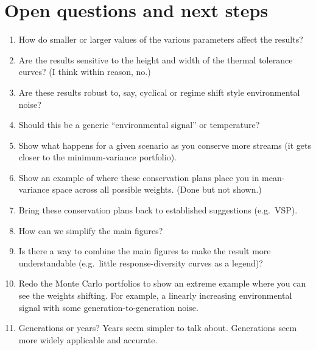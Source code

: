 \documentclass[12pt]{article}
\begin{document}
\section{Open questions and next steps}

\begin{enumerate}
\def\labelenumi{\arabic{enumi}.}
\itemsep1pt\parskip0pt
\item
  How do smaller or larger values of the various parameters affect the
  results?
\item
  Are the results sensitive to the height and width of the thermal
  tolerance curves? (I think within reason, no.)
\item
  Are these results robust to, say, cyclical or regime shift style
  environmental noise?
\item
  Should this be a generic ``environmental signal'' or temperature?
\item
  Show what happens for a given scenario as you conserve more streams
  (it gets closer to the minimum-variance portfolio).
\item
  Show an example of where these conservation plans place you in
  mean-variance space across all possible weights. (Done but not shown.)
\item
  Bring these conservation plans back to established suggestions
  (e.g.~VSP).
\item
  How can we simplify the main figures?
\item
  Is there a way to combine the main figures to make the result more
  understandable (e.g.~little response-diversity curves as a legend)?
\item
  Redo the Monte Carlo portfolios to show an extreme example where you
  can see the weights shifting. For example, a linearly increasing
  environmental signal with some generation-to-generation noise.
\item
  Generations or years? Years seem simpler to talk about. Generations
  seem more widely applicable and accurate.
\end{enumerate}

\clearpage

\renewcommand\refname{References}

\end{document}
